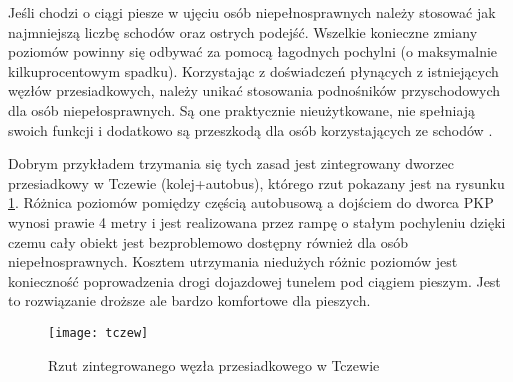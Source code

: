 \documentclass[twoside,12pt]{article}
\begin{document}
	Jeśli chodzi o ciągi piesze w ujęciu osób niepełnosprawnych należy stosować jak najmniejszą liczbę schodów oraz ostrych podejść. Wszelkie konieczne zmiany poziomów powinny się odbywać za pomocą łagodnych pochylni (o maksymalnie kilkuprocentowym spadku). Korzystając z doświadczeń płynących z istniejących węzłów przesiadkowych, należy unikać stosowania podnośników przyschodowych dla osób niepełosprawnych. Są one praktycznie nieużytkowane, nie spełniają swoich funkcji i dodatkowo są przeszkodą dla osób korzystających ze schodów \cite{zaluski}. 
	
	Dobrym przykładem trzymania się tych zasad jest zintegrowany dworzec przesiadkowy w Tczewie (kolej+autobus), którego rzut pokazany jest na rysunku \ref{tczew}. Różnica poziomów pomiędzy częścią autobusową a dojściem do dworca PKP wynosi prawie 4 metry i jest realizowana przez rampę o stałym pochyleniu dzięki czemu cały obiekt jest bezproblemowo dostępny również dla osób niepełnosprawnych. Kosztem utrzymania niedużych różnic poziomów jest konieczność poprowadzenia drogi dojazdowej tunelem pod ciągiem pieszym. Jest to rozwiązanie droższe ale bardzo komfortowe dla pieszych.
	
	\begin{figure}[H]
		\centering
		\texttt{[image: tczew]}\\
		\caption{Rzut zintegrowanego węzła przesiadkowego w Tczewie}
		\label{tczew}
	\end{figure}
	
\end{document}
